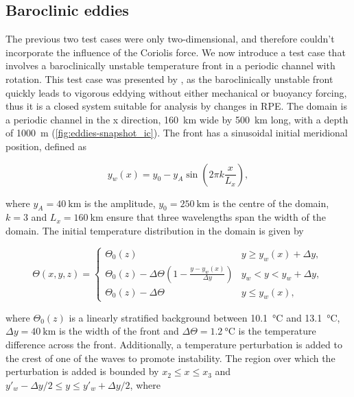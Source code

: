 \subsection{Baroclinic eddies}


The previous two test cases were only two-dimensional, and therefore couldn't incorporate the influence of the Coriolis force. We now introduce a test case that involves a baroclinically unstable temperature front in a periodic channel with rotation. This test case was presented by \citet{ilicak12}, as the baroclinically unstable front quickly leads to vigorous eddying without either mechanical or buoyancy forcing, thus it is a closed system suitable for analysis by changes in RPE. The domain is a periodic channel in the x direction, \SI{160}{\kilo\metre} wide by \SI{500}{\kilo\metre} long, with a depth of \SI{1000}{\metre} (\cref{fig:eddies-snapshot_ic}). The front has a sinusoidal initial meridional position, defined as

\begin{equation}
  y_w(x) = y_0 - y_A \sin\left(2\pi k \frac{x}{L_x}\right),
\end{equation}

where $y_A = \SI{40}{\kilo\metre}$ is the amplitude, $y_0 = \SI{250}{\kilo\metre}$ is the centre of the domain, $k = 3$ and $L_x = \SI{160}{\kilo\metre}$ ensure that three wavelengths span the width of the domain. The initial temperature distribution in the domain is given by

\begin{equation}
  \Theta(x,y,z) = \begin{cases}
    \Theta_0(z) & y \ge y_w(x) + \Delta y, \\
    \Theta_0(z) - \Delta \Theta \left(1 - \frac{y - y_w(x)}{\Delta y}\right) & y_w < y < y_w + \Delta y, \\
    \Theta_0(z) - \Delta \Theta & y \le y_w(x),
  \end{cases}
\end{equation}

where $\Theta_0(z)$ is a linearly stratified background between \SI{10.1}{\celsius} and \SI{13.1}{\celsius}, $\Delta y = \SI{40}{\kilo\metre}$ is the width of the front and $\Delta \Theta = \SI{1.2}{\celsius}$ is the temperature difference across the front. Additionally, a temperature perturbation is added to the crest of one of the waves to promote instability. The region over which the perturbation is added is bounded by $x_2 \le x \le x_3$ and $y'_w - \Delta y / 2 \le y \le y'_w + \Delta y / 2$, where

